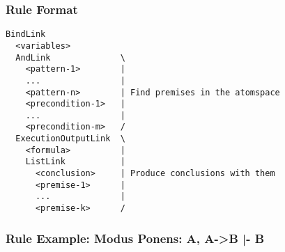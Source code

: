 \documentclass{beamer}
\begin{document}
\begin{frame}[fragile]
  \frametitle{Rule Format}
  {\small
\begin{verbatim}
BindLink
  <variables>
  AndLink              \
    <pattern-1>        |
    ...                |
    <pattern-n>        | Find premises in the atomspace
    <precondition-1>   |
    ...                |
    <precondition-m>   /
  ExecutionOutputLink  \
    <formula>          |
    ListLink           |
      <conclusion>     | Produce conclusions with them
      <premise-1>      |
      ...              |
      <premise-k>      /
\end{verbatim}
}
\end{frame}

\begin{frame}[fragile]
  \frametitle{Rule Example: Modus Ponens: A, A->B |- B}


\end{frame}
\end{document}
